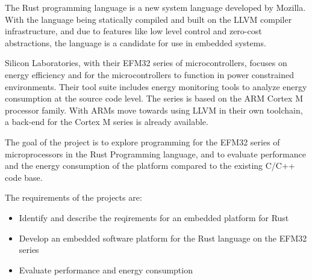 
\label{chap:problem}

The Rust programming language is a new system language developed by Mozilla.
With the language being statically compiled and built on the LLVM compiler infrastructure, and due to features like low level control and zero-cost abstractions, the language is a candidate for use in embedded systems.

Silicon Laboratories, with their EFM32 series of microcontrollers, focuses on energy efficiency and for the microcontrollers to function in power constrained environments.
Their tool suite includes energy monitoring tools to analyze energy consumption at the source code level. The series is based on the ARM Cortex M processor family.
With ARMs move towards using LLVM in their own toolchain, a back-end for the Cortex M series is already available.

The goal of the project is to explore programming for the EFM32 series of microprocessors in the Rust Programming language, and to evaluate performance and the energy consumption of the platform compared to the existing C/C++ code base.

The requirements of the projects are:

\begin{itemize}
    \item Identify and describe the reqirements for an embedded platform for Rust
    \item Develop an embedded software platform for the Rust language on the EFM32 series
    \item Evaluate performance and energy consumption
\end{itemize}
